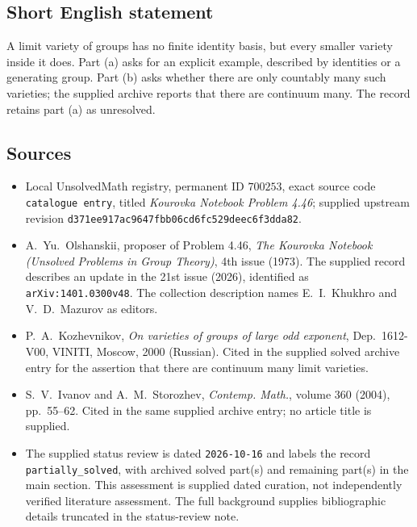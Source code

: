 \documentclass[11pt]{article}
\begin{document}
\subsection{Short English statement}
A limit variety of groups has no finite identity basis, but every smaller variety inside it does. Part (a) asks for an explicit example, described by identities or a generating group. Part (b) asks whether there are only countably many such varieties; the supplied archive reports that there are continuum many. The record retains part (a) as unresolved.
\subsection{Sources}
\begin{itemize}
\item Local UnsolvedMath registry, permanent ID \(700253\), exact source code \texttt{catalogue entry}, titled \emph{Kourovka Notebook Problem 4.46}; supplied upstream revision \texttt{d371ee917ac9647fbb06cd6fc529deec6f3dda82}.
\item A.\ Yu.\ Olshanskii, proposer of Problem 4.46, \emph{The Kourovka Notebook (Unsolved Problems in Group Theory)}, 4th issue (1973). The supplied record describes an update in the 21st issue (2026), identified as \texttt{arXiv:1401.0300v48}. The collection description names E.\ I.\ Khukhro and V.\ D.\ Mazurov as editors.
\item P.\ A.\ Kozhevnikov, \emph{On varieties of groups of large odd exponent}, Dep.\ 1612-V00, VINITI, Moscow, 2000 (Russian). Cited in the supplied solved archive entry for the assertion that there are continuum many limit varieties.
\item S.\ V.\ Ivanov and A.\ M.\ Storozhev, \emph{Contemp. Math.}, volume 360 (2004), pp.\ 55--62. Cited in the same supplied archive entry; no article title is supplied.
\item The supplied status review is dated \texttt{2026-10-16} and labels the record \texttt{partially\_solved}, with archived solved part(s) and remaining part(s) in the main section. This assessment is supplied dated curation, not independently verified literature assessment. The full background supplies bibliographic details truncated in the status-review note.
\end{itemize}
\end{document}
